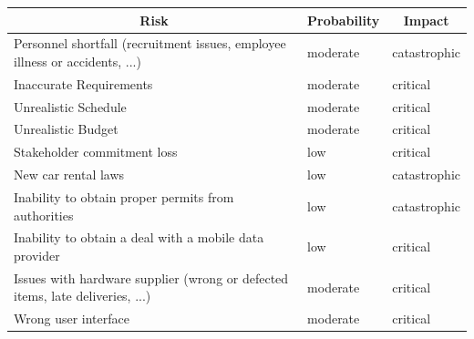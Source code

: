 \documentclass[english]{article}
\begin{document}
\begin{center}
	\begin{tabular}{|p{7cm}|p{2cm}|p{2cm}|}
		\hline
		\multicolumn{1}{|c|}{\textbf{Risk}} & \multicolumn{1}{c|}{\textbf{Probability}} & \multicolumn{1}{c|}{\textbf{Impact}} \\
		\hline
		Personnel shortfall (recruitment issues, employee illness or accidents, ...)& moderate & catastrophic\\
		\hline
		Inaccurate Requirements & moderate & critical\\
		\hline
		Unrealistic Schedule & moderate & critical\\
		\hline
		Unrealistic Budget & moderate & critical\\
		\hline
		Stakeholder commitment loss & low & critical\\
		\hline
		New car rental laws & low & catastrophic \\
		\hline
		Inability to obtain proper permits from authorities  & low & catastrophic \\
		\hline
		Inability to obtain a deal with a mobile data provider  & low & critical \\
		\hline		
		Issues with hardware supplier (wrong or defected items, late deliveries, ...) & moderate & critical \\
		\hline
		Wrong user interface & moderate & critical\\
		\hline
	\end{tabular}
\end{center}

\paragraph{}
\end{document}
